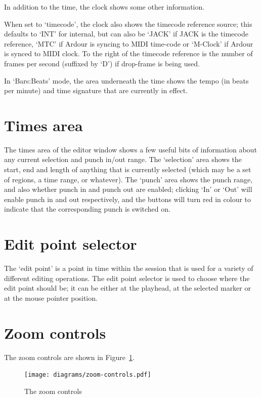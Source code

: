\documentclass[10pt,a4paper]{book}
\begin{document}
{In addition to the time, the clock shows some other information.

When set to `timecode', the clock also shows the timecode reference
source; this defaults to `INT' for internal, but can also be `JACK' if
JACK is the timecode reference, `MTC' if Ardour is syncing to MIDI
time-code or `M-Clock' if Ardour is synced to MIDI clock.  To the
right of the timecode reference is the number of frames per second
(suffixed by `D') if drop-frame is being used.

In `Bars:Beats' mode, the area underneath the time shows the tempo (in
beats per minute) and time signature that are currently in effect.

\section{Times area}

The times area of the editor window shows a few useful bits of
information about any current selection and punch in/out range.  The
`selection' area shows the start, end and length of anything that is
currently selected (which may be a set of regions, a time range, or
whatever).  The `punch' area shows the punch range, and also whether
punch in and punch out are enabled; clicking `In' or `Out' will enable
punch in and out respectively, and the buttons will turn red in colour
to indicate that the corresponding punch is switched on.

\section{Edit point selector}
\label{sec:edit-point-selector}

The `edit point' is a point in time within the session that is used
for a variety of different editing operations.  The edit point
selector is used to choose where the edit point should be; it can be
either at the playhead, at the selected marker or at the
mouse pointer position.

\section{Zoom controls}

The zoom controls are shown in Figure~\ref{fig:zoom-controls}.

\begin{figure}[ht]
\begin{center}
\texttt{[image: diagrams/zoom-controls.pdf]}
\end{center}
\caption{The zoom controls}
\label{fig:zoom-controls}
\end{figure}

}
\end{document}
